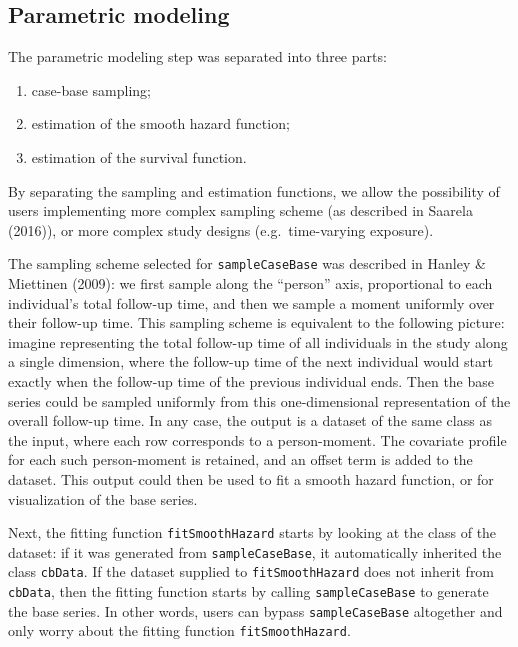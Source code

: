 \hypertarget{parametric-modeling}{%
\subsection{Parametric modeling}\label{parametric-modeling}}

The parametric modeling step was separated into three parts:

\begin{enumerate}
\def\labelenumi{\arabic{enumi}.}
\tightlist
\item
  case-base sampling;
\item
  estimation of the smooth hazard function;
\item
  estimation of the survival function.
\end{enumerate}

By separating the sampling and estimation functions, we allow the possibility of users implementing more complex sampling scheme (as described in Saarela (2016)), or more complex study designs (e.g.~time-varying exposure).

The sampling scheme selected for \texttt{sampleCaseBase} was described in Hanley \& Miettinen (2009): we first sample along the ``person'' axis, proportional to each individual's total follow-up time, and then we sample a moment uniformly over their follow-up time. This sampling scheme is equivalent to the following picture: imagine representing the total follow-up time of all individuals in the study along a single dimension, where the follow-up time of the next individual would start exactly when the follow-up time of the previous individual ends. Then the base series could be sampled uniformly from this one-dimensional representation of the overall follow-up time. In any case, the output is a dataset of the same class as the input, where each row corresponds to a person-moment. The covariate profile for each such person-moment is retained, and an offset term is added to the dataset. This output could then be used to fit a smooth hazard function, or for visualization of the base series.

Next, the fitting function \texttt{fitSmoothHazard} starts by looking at the class of the dataset: if it was generated from \texttt{sampleCaseBase}, it automatically inherited the class \texttt{cbData}. If the dataset supplied to \texttt{fitSmoothHazard} does not inherit from \texttt{cbData}, then the fitting function starts by calling \texttt{sampleCaseBase} to generate the base series. In other words, users can bypass \texttt{sampleCaseBase} altogether and only worry about the fitting function \texttt{fitSmoothHazard}.

